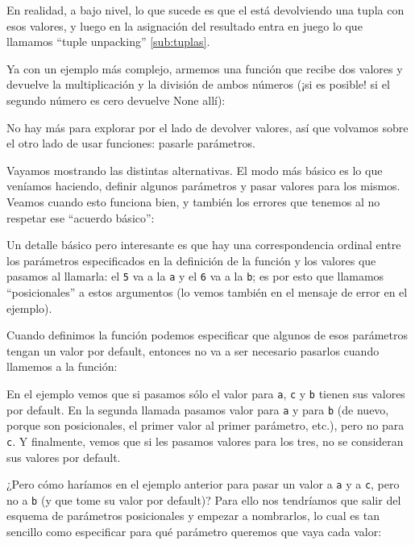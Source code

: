 \begin{info}
En realidad, a bajo nivel, lo que sucede es que el  está devolviendo una tupla con esos valores, y luego en la asignación del resultado entra en juego lo que llamamos ``tuple unpacking'' \ref{sub:tuplas}.
\end{info}

Ya con un ejemplo más complejo, armemos una función que recibe dos valores y devuelve la multiplicación y la división de ambos números (¡si es posible! si el segundo número es cero devuelve None allí):


No hay más para explorar por el lado de devolver valores, así que volvamos sobre el otro lado de usar funciones: pasarle parámetros.

Vayamos mostrando las distintas alternativas. El modo más básico es lo que veníamos haciendo, definir algunos parámetros y pasar valores para los mismos. Veamos cuando esto funciona bien, y también los errores que tenemos al no respetar ese ``acuerdo básico'':


Un detalle básico pero interesante es que hay una correspondencia ordinal entre los parámetros especificados en la definición de la función y los valores que pasamos al llamarla: el \verb|5| va a la \verb|a| y el \verb|6| va a la \verb|b|; es por esto que llamamos ``posicionales'' a estos argumentos (lo vemos también en el mensaje de error en el ejemplo).

Cuando definimos la función podemos especificar que algunos de esos parámetros tengan un valor por default, entonces no va a ser necesario pasarlos cuando llamemos a la función:


En el ejemplo vemos que si pasamos sólo el valor para \verb|a|, \verb|c| y \verb|b| tienen sus valores por default. En la segunda llamada pasamos valor para \verb|a| y para \verb|b| (de nuevo, porque son posicionales, el primer valor al primer parámetro, etc.), pero no para \verb|c|. Y finalmente, vemos que si les pasamos valores para los tres, no se consideran sus valores por default.

¿Pero cómo haríamos en el ejemplo anterior para pasar un valor a \verb|a| y a \verb|c|, pero no a \verb|b| (y que tome su valor por default)? Para ello nos tendríamos que salir del esquema de parámetros posicionales y empezar a nombrarlos, lo cual es tan sencillo como especificar para qué parámetro queremos que vaya cada valor:

